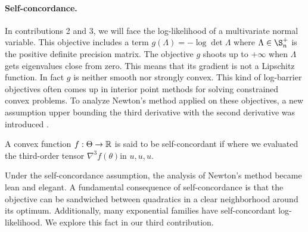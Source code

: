 \paragraph{Self-concordance.}
In contributions 2 and 3, we will face the log-likelihood of a multivariate normal variable. 
This objective includes a term $g(\Lambda) = -\log \det \Lambda$ where $\Lambda\in \S_n^+$ is the positive definite precision matrix. 
The objective $g$ shoots up to $+\infty$ when $\Lambda$ gets eigenvalues close from zero. 
This means that its gradient is not a Lipschitz function.
In fact  $g$ is neither smooth nor strongly convex.
This kind of log-barrier objectives often comes up in interior point methods for solving constrained convex problems.
To analyze Newton's method applied on these objectives, a new assumption upper bounding the third derivative with the second derivative was introduced \citep{nemirovski1983problem}. 
\begin{definition}
	\citep[definition 4.1.1]{nesterov2004Intro}
	A convex function $f:\Theta \rightarrow\mathbb{R}$ is said to be self-concordant if
	where we evaluated the third-order tensor $\nabla^3 f(\theta)$in $u,u,u$.
\end{definition}
Under the self-concordance assumption, the analysis of Newton's method became lean and elegant. A fundamental consequence of self-concordance is that the objective can be sandwiched between quadratics in a clear neighborhood around its optimum. Additionally, many exponential families have self-concordant log-likelihood. We explore this fact in our third contribution.

